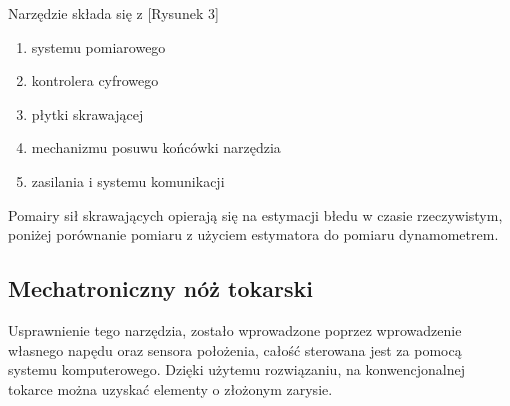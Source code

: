 \documentclass[13pt]{article}
\begin{document}




Narzędzie składa się z [Rysunek 3]
\begin{enumerate}
\item systemu pomiarowego
\item kontrolera cyfrowego
\item płytki skrawającej
\item mechanizmu posuwu końcówki narzędzia
\item zasilania i systemu komunikacji
\end{enumerate}

\newpage

Pomairy sił skrawających opierają się na estymacji błedu w czasie rzeczywistym, poniżej porównanie pomiaru z użyciem estymatora do pomiaru dynamometrem.



\newpage

\subsection{Mechatroniczny nóż tokarski}
Usprawnienie tego narzędzia, zostało wprowadzone poprzez wprowadzenie własnego napędu oraz sensora położenia, całość sterowana jest za pomocą systemu komputerowego. Dzięki użytemu rozwiązaniu, na konwencjonalnej tokarce można uzyskać elementy o złożonym zarysie. \cite{ksiazka}
\end{document}
